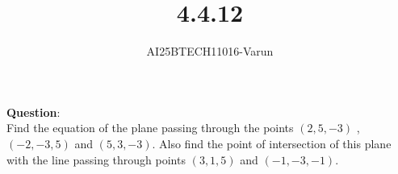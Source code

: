 \documentclass[journal]{IEEEtran}
\begin{document}

\vspace{3cm}

\title{4.4.12}
\author{AI25BTECH11016-Varun}
 \maketitle
{\let\newpage\relax\maketitle}
\renewcommand{\thefigure}{\theenumi}
\renewcommand{\thetable}{\theenumi}
\setlength{\intextsep}{10pt} %

\renewcommand{\thetable}{\theenumi}
\textbf{Question}:\\

Find the equation of the plane passing through the points $(2, 5, -3)$ , $(-2, -3, 5)$ and
$(5, 3, -3)$. Also find the point of intersection of this plane with the line passing
through points $(3, 1, 5)$ and $(-1, -3, -1)$.
\end{document}
